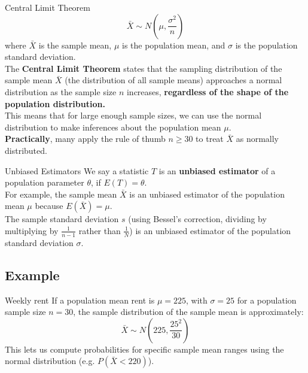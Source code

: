 \documentclass[10pt, total={6in, 8in}]{extarticle}
\begin{document}
\begin{definitionbox}{Central Limit Theorem}{}
    $$\bar{X} \sim N\left(\mu, \frac{\sigma^2}{n}\right)$$
    where $\bar{X}$ is the sample mean, $\mu$ is the population mean, and $\sigma$ is the population standard deviation.\\

    The \textbf{Central Limit Theorem} states that the sampling distribution of the sample mean $\bar{X}$ (the distribution of all sample means)  approaches a normal distribution as the sample size $n$ increases, \textbf{regardless of the shape of the population distribution.}\\

    This means that for large enough sample sizes, we can use the normal distribution to make inferences about the population mean $\mu$. \\

    \textbf{Practically}, many apply the rule of thumb $n \geq 30$ to treat $\bar{X}$ as normally distributed.
\end{definitionbox}


\begin{definitionbox}{Unbiased Estimators}{}
    We say a statistic $T$ is an \textbf{unbiased estimator} of a population parameter $\theta$,  if $E(T) = \theta$.\\

    For example, the sample mean $\bar{X}$ is an unbiased estimator of the population mean $\mu$ because $E(\bar{X}) = \mu$.\\

    The sample standard deviation $s$ (using Bessel's correction, dividing by multiplying by $\frac{1}{n-1}$ rather than $\frac{1}{N}$) is an unbiased estimator of the population standard deviation $\sigma$.
\end{definitionbox}

\subsection{Example}
\begin{examplebox}{Weekly rent}{}
    If a population mean rent is $\mu = 225$, with $\sigma = 25$ for a population sample size $n = 30$, the sample distribution of the sample mean is approximately:
    $$\bar{X} \sim N\left(225, \frac{25^2}{30}\right)$$
    This lets us compute probabilities for specific sample mean ranges using the normal distribution (e.g. $P(\bar{X} < 220)$).
\end{examplebox}
\end{document}

